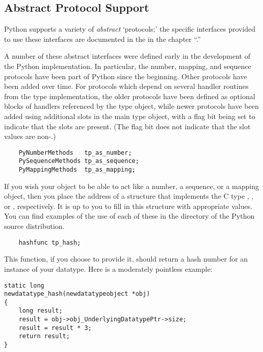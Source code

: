 \subsection{Abstract Protocol Support}

Python supports a variety of \emph{abstract} `protocols;' the specific
interfaces provided to use these interfaces are documented in the
 in the
chapter ``.''

A number of these abstract interfaces were defined early in the
development of the Python implementation.  In particular, the number,
mapping, and sequence protocols have been part of Python since the
beginning.  Other protocols have been added over time.  For protocols
which depend on several handler routines from the type implementation,
the older protocols have been defined as optional blocks of handlers
referenced by the type object, while newer protocols have been added
using additional slots in the main type object, with a flag bit being
set to indicate that the slots are present.  (The flag bit does not
indicate that the slot values are non-\NULL.)

\begin{verbatim}
    PyNumberMethods   tp_as_number;
    PySequenceMethods tp_as_sequence;
    PyMappingMethods  tp_as_mapping;
\end{verbatim}

If you wish your object to be able to act like a number, a sequence,
or a mapping object, then you place the address of a structure that
implements the C type ,
, or , respectively.
It is up to you to fill in this structure with appropriate values. You
can find examples of the use of each of these in the 
directory of the Python source distribution.


\begin{verbatim}
    hashfunc tp_hash;
\end{verbatim}

This function, if you choose to provide it, should return a hash
number for an instance of your datatype. Here is a moderately
pointless example:

\begin{verbatim}
static long
newdatatype_hash(newdatatypeobject *obj)
{
    long result;
    result = obj->obj_UnderlyingDatatypePtr->size;
    result = result * 3;
    return result;
}
\end{verbatim}

